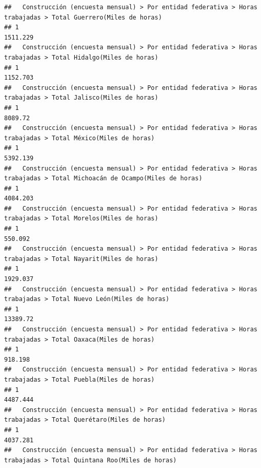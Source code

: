 \documentclass[
]{article}
\begin{document}
\begin{verbatim}
##   Construcción (encuesta mensual) > Por entidad federativa > Horas trabajadas > Total Guerrero(Miles de horas) 
## 1                                                                                                      1511.229
##   Construcción (encuesta mensual) > Por entidad federativa > Horas trabajadas > Total Hidalgo(Miles de horas) 
## 1                                                                                                     1152.703
##   Construcción (encuesta mensual) > Por entidad federativa > Horas trabajadas > Total Jalisco(Miles de horas) 
## 1                                                                                                      8089.72
##   Construcción (encuesta mensual) > Por entidad federativa > Horas trabajadas > Total México(Miles de horas) 
## 1                                                                                                    5392.139
##   Construcción (encuesta mensual) > Por entidad federativa > Horas trabajadas > Total Michoacán de Ocampo(Miles de horas) 
## 1                                                                                                                 4084.203
##   Construcción (encuesta mensual) > Por entidad federativa > Horas trabajadas > Total Morelos(Miles de horas) 
## 1                                                                                                      550.092
##   Construcción (encuesta mensual) > Por entidad federativa > Horas trabajadas > Total Nayarit(Miles de horas) 
## 1                                                                                                     1929.037
##   Construcción (encuesta mensual) > Por entidad federativa > Horas trabajadas > Total Nuevo León(Miles de horas) 
## 1                                                                                                        13389.72
##   Construcción (encuesta mensual) > Por entidad federativa > Horas trabajadas > Total Oaxaca(Miles de horas) 
## 1                                                                                                     918.198
##   Construcción (encuesta mensual) > Por entidad federativa > Horas trabajadas > Total Puebla(Miles de horas) 
## 1                                                                                                    4487.444
##   Construcción (encuesta mensual) > Por entidad federativa > Horas trabajadas > Total Querétaro(Miles de horas) 
## 1                                                                                                       4037.281
##   Construcción (encuesta mensual) > Por entidad federativa > Horas trabajadas > Total Quintana Roo(Miles de horas) 

\end{verbatim}
\end{document}
